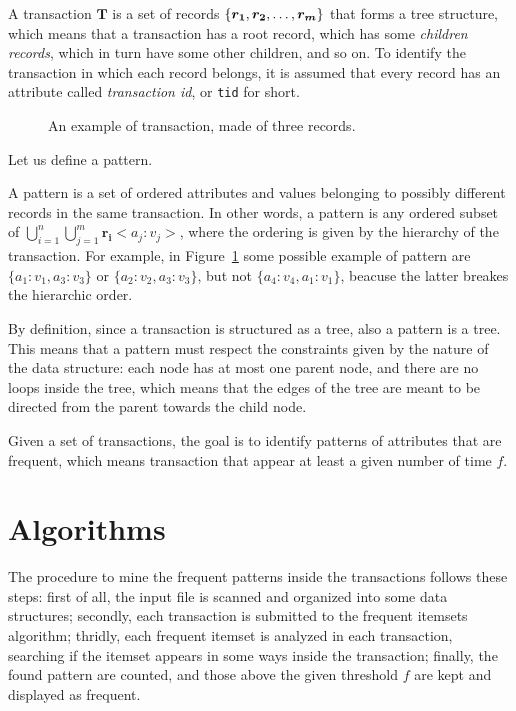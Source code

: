 \documentclass{acm_proc_article-sp-sigmod09}
\begin{document}
A transaction $\boldsymbol{T}$ is a set of records $\{\boldsymbol{r_1}, \boldsymbol{r_2}, \text{\dots}, \boldsymbol{r_m}\}$ that forms a tree structure, which means that a transaction has a root record, which has some \emph{children records}, which in turn have some other children, and so on. To identify the transaction in which each record belongs, it is assumed that every record has an attribute called \emph{transaction id}, or \texttt{tid} for short.

\begin{figure}
\centering
{}
\caption{An example of transaction, made of three records.}
\label{fig:transaction}
\end{figure}

Let us define a pattern.
\begin{definition}
A pattern is a set of ordered attributes and values belonging to possibly different records in the same transaction. In other words, a pattern is any ordered subset of $\bigcup\limits_{i=1}^{n} \bigcup\limits_{j=1}^{m} \boldsymbol{r_i}<a_j \colon v_j>$, where the ordering is given by the hierarchy of the transaction. For example, in Figure~\ref{fig:transaction} some possible example of pattern are $\{a_1 \colon v_1, a_3 \colon v_3\}$ or $\{a_2 \colon v_2, a_3 \colon v_3\}$, but not $\{a_4 \colon v_4, a_1 \colon v_1\}$, beacuse the latter breakes the hierarchic order.

By definition, since a transaction is structured as a tree, also a pattern is a tree. This means that a pattern must respect the constraints given by the nature of the data structure: each node has at most one parent node, and there are no loops inside the tree, which means that the edges of the tree are meant to be directed from the parent towards the child node.
\end{definition}

Given a set of transactions, the goal is to identify patterns of attributes that are frequent, which means transaction that appear at least a given number of time $f$.

\section{Algorithms}
\label{sec:alg}
The procedure to mine the frequent patterns inside the transactions follows these steps: first of all, the input file is scanned and organized into some data structures; secondly, each transaction is submitted to the frequent itemsets algorithm; thridly, each frequent itemset is analyzed in each transaction, searching if the itemset appears in some ways inside the transaction; finally, the found pattern are counted, and those above the given threshold $f$ are kept and displayed as frequent.
\end{document}
